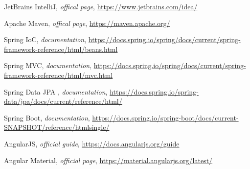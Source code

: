 \begin{thebibliography}{99999}
\singlespace\normalsize

 JetBrains IntelliJ, \textit{offical page}, \url{https://www.jetbrains.com/idea/}

 Apache Maven, \textit{offical page}, \url{https://maven.apache.org/}

 Spring IoC, \textit{documentation}, \url{https://docs.spring.io/spring/docs/current/spring-framework-reference/html/beans.html}

 Spring MVC, \textit{documentation}, \url{https://docs.spring.io/spring/docs/current/spring-framework-reference/html/mvc.html}

 Spring Data JPA , \textit{documentation}, \url{https://docs.spring.io/spring-data/jpa/docs/current/reference/html/}

 Spring Boot, \textit{documentation}, \url{https://docs.spring.io/spring-boot/docs/current-SNAPSHOT/reference/htmlsingle/}

 AngularJS, \textit{official guide}, \url{https://docs.angularjs.org/guide}

 Angular Material, \textit{official page}, \url{https://material.angularjs.org/latest/}

\end{thebibliography}
